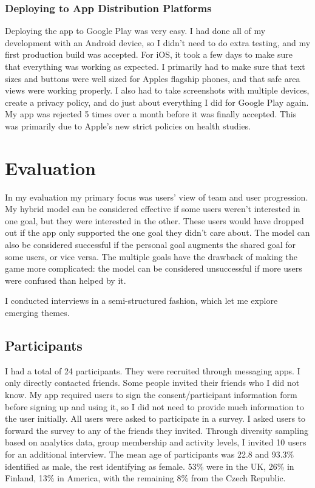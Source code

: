 \documentclass{l4proj}
\begin{document}
\subsection{Deploying to App Distribution Platforms}
Deploying the app to Google Play was very easy. I had done all of my development with an Android device, so I didn't need to do extra testing, and my first production build was accepted. For iOS, it took a few days to make sure that everything was working as expected. I primarily had to make sure that text sizes and buttons were well sized for Apples flagship phones, and that safe area views were working properly. I also had to take screenshots with multiple devices, create a privacy policy, and do just about everything I did for Google Play again. My app was rejected 5 times over a month before it was finally accepted. This was primarily due to Apple's new strict policies on health studies.

\chapter{Evaluation}
In my evaluation my primary focus was users' view of team and user progression. My hybrid model can be considered effective if some users weren't interested in one goal, but they were interested in the other. These users would have dropped out if the app only supported the one goal they didn't care about. The model can also be considered successful if the personal goal augments the shared goal for some users, or vice versa. The multiple goals have the drawback of making the game more complicated: the model can be considered unsuccessful if more users were confused than helped by it. 

I conducted interviews in a semi-structured fashion, which let me explore emerging themes.  

\section{Participants}
I had a total of 24 participants. They were recruited through messaging apps. I only directly contacted friends. Some people invited their friends who I did not know. My app required users to sign the consent/participant information form before signing up and using it, so I did not need to provide much information to the user initially. All users were asked to participate in a survey. I asked users to forward the survey to any of the friends they invited. Through diversity sampling based on analytics data, group membership and activity levels, I invited 10 users for an additional interview. The mean age of participants was 22.8 and 93.3\% identified as male, the rest identifying as female. 53\% were in the UK, 26\% in Finland, 13\% in America, with the remaining 8\% from the Czech Republic. 
\end{document}
